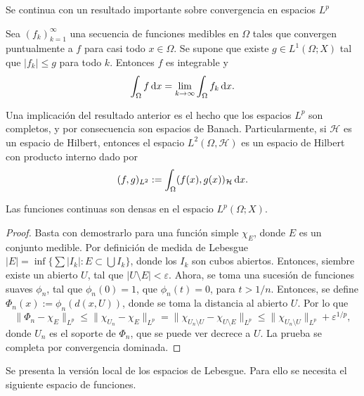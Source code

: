 Se continua con un resultado importante sobre convergencia en 
espacios $L^p$
\begin{theorem}
    Sea $(f_k)_{k=1}^\infty$ una secuencia de funciones medibles en $\Omega$ 
    tales que convergen puntualmente a $f$ para casi todo $x\in\Omega$. Se supone
    que existe $g\in L^1(\Omega;X)$ tal que $|f_k|\leq g$ para todo $k$. Entonces
    $f$ es integrable y 
    \begin{equation*}
        \int_\Omega f \mathop{}\!\mathrm{d} x = \lim_{k\rightarrow\infty} \int_\Omega 
        f_k \mathop{}\!\mathrm{d} x.
    \end{equation*}
\end{theorem}
\begin{remark}
    Una implicación del resultado anterior es el hecho que los espacios $L^p$ son 
    completos, y por consecuencia son espacios de Banach. Particularmente, si $\mathcal{H}$ es un espacio de Hilbert, entonces el 
    espacio $L^2(\Omega,\mathcal{H})$ es un espacio de Hilbert con producto interno dado por
    \begin{equation*}
        (f, g)_{L^2} := \int_\Omega (f(x), g(x))_{\mathcal{H}}\mathop{}\!\mathrm{d} x.
    \end{equation*}
\end{remark}
\begin{theorem}
	Las funciones continuas son densas en el espacio $L^p(\Omega;X)$.
\end{theorem}
\begin{proof}
	Basta con demostrarlo para una función simple $\chi_E$, donde $E$ es un conjunto medible. Por definición de medida de Lebesgue 
	$|E| = \inf\{\sum |I_k| : E \subset \bigcup I_k\}$, donde los $I_k$ son cubos abiertos. Entonces, siembre existe un abierto $U$, tal que $|U\setminus E|<\varepsilon$. Ahora, se toma una sucesión de funciones suaves $\phi_n$, tal que $\phi_n(0)=1$, que $\phi_n(t)=0$, para $t>1/n$. Entonces, se define $\Phi_n(x) := \phi_n(d(x, U))$, donde se toma la distancia al abierto $U$. Por lo que 
	\begin{equation*}
		\|\Phi_n - \chi_E\|_{L^p} \leq \|\chi_{U_n} - \chi_E\|_{L^p} = \|\chi_{U_n\setminus U} - \chi_{U\setminus E}\|_{L^p} \leq \|\chi_{U_n\setminus U} \|_{L^p} +\varepsilon^{1/p},
	\end{equation*}
	donde $U_n$ es el soporte de $\Phi_n$, que se puede ver decrece a $U$. La prueba se completa por convergencia dominada.
\end{proof}
Se presenta la versión local de los espacios de Lebesgue. Para ello se necesita el siguiente espacio de funciones.
